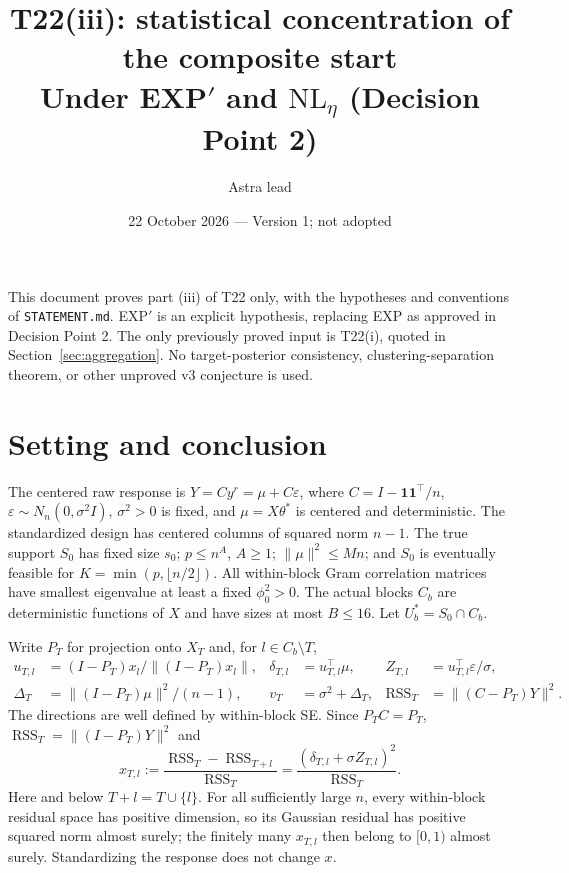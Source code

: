 \documentclass[11pt]{article}
\title{T22(iii): statistical concentration of the composite start\\
\large Under EXP$'$ and $\mathrm{NL}_{\eta}$ (Decision Point 2)}
\author{Astra lead}
\date{22 October 2026 \quad --- \quad Version 1; not adopted}
\theoremstyle{remark}\newtheorem{remark}{Remark}
\newcommand{\RSS}{\operatorname{RSS}}
\begin{document}
\maketitle

\noindent This document proves part (iii) of T22 only, with the hypotheses and
conventions of \texttt{STATEMENT.md}. EXP$'$ is an explicit hypothesis, replacing
EXP as approved in Decision Point 2. The only previously proved input is
T22(i), quoted in Section~\ref{sec:aggregation}. No target-posterior consistency,
clustering-separation theorem, or other unproved v3 conjecture is used.

\section{Setting and conclusion}

The centered raw response is $Y=Cy^r=\mu+C\varepsilon$, where
$C=I-\mathbf1\mathbf1^\top/n$, $\varepsilon\sim N_n(0,\sigma^2 I)$,
$\sigma^2>0$ is fixed, and $\mu=X\theta^*$ is centered and deterministic.
The standardized design has centered columns of squared norm $n-1$.
The true support $S_0$ has fixed size $s_0$; $p\le n^A$, $A\ge1$;
$\|\mu\|^2\le Mn$; and $S_0$ is eventually feasible for
$K=\min(p,\lfloor n/2\rfloor)$. All within-block Gram correlation matrices
have smallest eigenvalue at least a fixed $\phi_0^2>0$.
The actual blocks $C_b$ are deterministic functions of $X$ and have sizes
at most $B\le16$. Let $U_b^*=S_0\cap C_b$.

Write $P_T$ for projection onto $X_T$ and, for $l\in C_b\setminus T$,
\begin{align*}
 u_{T,l}&=(I-P_T)x_l/\|(I-P_T)x_l\|,&
 \delta_{T,l}&=u_{T,l}^\top\mu,&Z_{T,l}&=u_{T,l}^\top\varepsilon/\sigma,\\
 \Delta_T&=\|(I-P_T)\mu\|^2/(n-1),&v_T&=\sigma^2+\Delta_T,&
 \RSS_T&=\|(C-P_T)Y\|^2.
\end{align*}
The directions are well defined by within-block SE. Since $P_T C=P_T$,
$\RSS_T=\|(I-P_T)Y\|^2$ and
\begin{equation}\label{eq:partial}
 x_{T,l}:=\frac{\RSS_T-\RSS_{T+l}}{\RSS_T}
 =\frac{(\delta_{T,l}+\sigma Z_{T,l})^2}{\RSS_T}.
\end{equation}
Here and below $T+l=T\cup\{l\}$. For all sufficiently large $n$, every
within-block residual space has positive dimension, so its Gaussian residual
has positive squared norm almost surely; the finitely many $x_{T,l}$ then
belong to $[0,1)$ almost surely. Standardizing the response does not change $x$.
\end{document}
